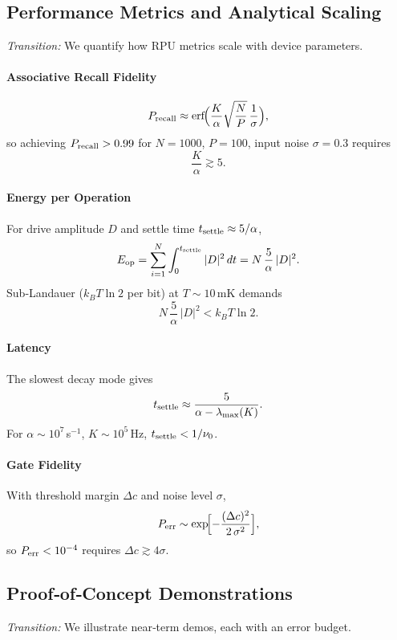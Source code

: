 \subsection{Performance Metrics and Analytical Scaling}
\emph{Transition:} We quantify how RPU metrics scale with device parameters.

\paragraph{Associative Recall Fidelity}
\[
P_{\rm recall}\approx\mathrm{erf}\!\Bigl(\frac{K}{\alpha}\sqrt{\frac{N}{P}}\,\frac{1}{\sigma}\Bigr),
\]
so achieving $P_{\rm recall}>0.99$ for $N=1000$, $P=100$, input noise $\sigma=0.3$ requires
\[
\frac{K}{\alpha}\gtrsim5.
\]

\paragraph{Energy per Operation}
For drive amplitude $D$ and settle time $t_{\rm settle}\approx5/\alpha$,
\[
E_{\rm op}
= \sum_{i=1}^N\int_0^{t_{\rm settle}}|D|^2\,dt
= N\,\frac{5}{\alpha}\,|D|^2.
\]
Sub‐Landauer ($k_BT\ln2$ per bit) at $T\sim10\,$mK demands
\[
N\,\frac{5}{\alpha}\,|D|^2 < k_BT\ln2.
\]

\paragraph{Latency}
The slowest decay mode gives
\[
t_{\rm settle}\approx\frac{5}{\alpha-\lambda_{\max}(K)}.
\]
For $\alpha\sim10^7\,$s$^{-1}$, $K\sim10^5\,$Hz, $t_{\rm settle}<1/\nu_0$.

\paragraph{Gate Fidelity}
With threshold margin $\Delta c$ and noise level $\sigma$,
\[
P_{\rm err}\sim\exp\!\Bigl[-\frac{(\Delta c)^2}{2\,\sigma^2}\Bigr],
\]
so $P_{\rm err}<10^{-4}$ requires $\Delta c\gtrsim4\sigma$.

\subsection{Proof‐of‐Concept Demonstrations}
\emph{Transition:} We illustrate near‐term demos, each with an error budget.

